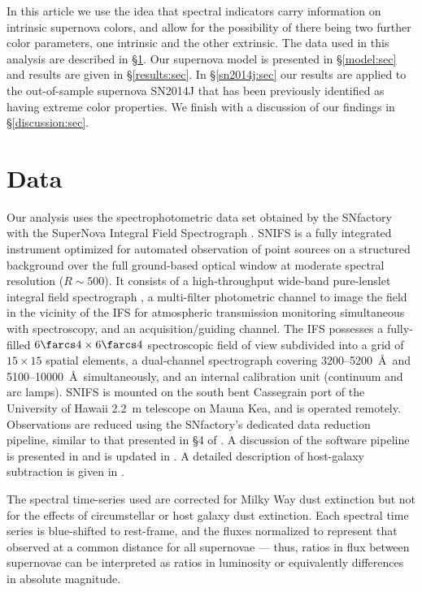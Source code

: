 \documentclass{aastex}   	%
\begin{document}
In this article we use the idea that spectral indicators carry information on intrinsic supernova colors,
and allow for the possibility of there being two further color parameters, one intrinsic and the other
extrinsic.  The data used in this analysis are described in \S\ref{data:sec}.  Our supernova model is presented in
\S\ref{model:sec} and results are given in \S\ref{results:sec}.  In \S\ref{sn2014j:sec} our results are applied to the out-of-sample
supernova SN2014J that has been previously identified as having extreme color properties.
We finish with a discussion of our findings in \S\ref{discussion:sec}.


\section{Data}
\label{data:sec}

Our analysis uses the spectrophotometric data set obtained by
the SNfactory with the SuperNova Integral Field
Spectrograph \citep[SNIFS,][]{2004SPIE.5249..146L}.  SNIFS is a fully integrated
instrument optimized for automated observation of point sources on a
structured background over the full ground-based optical window at
moderate spectral resolution ($R \sim 500$).  It consists of a
high-throughput wide-band pure-lenslet integral field spectrograph
\citep[IFS, ``\`a la TIGER;''][]{1995A&AS..113..347B,2000ASPC..195..173B,2001MNRAS.326...23B}, a
multi-filter photometric channel to image the field in the vicinity of
the IFS for atmospheric transmission monitoring simultaneous with
spectroscopy, and an acquisition/guiding channel.  The IFS possesses a
fully-filled $6\farcs 4 \times 6\farcs 4$ spectroscopic field of view
subdivided into a grid of $15 \times 15$ spatial elements, a
dual-channel spectrograph covering 3200--5200~\AA\ and 5100--10000~\AA\
simultaneously, and an internal calibration unit (continuum and arc
lamps).  SNIFS is mounted on the south bent Cassegrain port of the
University of Hawaii 2.2~m telescope on Mauna Kea, and is operated
remotely.  Observations are reduced using the SNfactory's dedicated data
reduction pipeline, similar to that presented in \S4 of \citet{2001MNRAS.326...23B}.
A discussion of the software pipeline is presented in
\citet{2006ApJ...650..510A} and is updated in \citet{2010ApJ...713.1073S}.  A detailed
description of host-galaxy subtraction is given in \citet{2011MNRAS.418..258B}.

The spectral time-series used are corrected for Milky Way dust
extinction \citep{1989ApJ...345..245C,1998ApJ...500..525S} but not for the
effects of circumstellar or host galaxy dust extinction.  
Each spectral time series is
blue-shifted to rest-frame, and the fluxes normalized to represent that
observed at a common distance for all supernovae --- thus, ratios
in flux between supernovae can be interpreted as ratios in
luminosity or equivalently differences in absolute magnitude.
\end{document}
